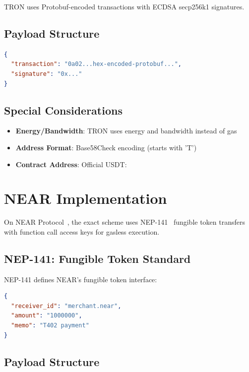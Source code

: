 TRON uses Protobuf-encoded transactions with ECDSA secp256k1 signatures.

\subsection{Payload Structure}

\begin{lstlisting}[language=json,caption={TRON exact scheme payload}]
{
  "transaction": "0a02...hex-encoded-protobuf...",
  "signature": "0x..."
}
\end{lstlisting}

\subsection{Special Considerations}

\begin{itemize}
    \item \textbf{Energy/Bandwidth}: TRON uses energy and bandwidth instead of gas
    \item \textbf{Address Format}: Base58Check encoding (starts with 'T')
    \item \textbf{Contract Address}: Official USDT: 
\end{itemize}

\section{NEAR Implementation}
\label{sec:near-implementation}

On NEAR Protocol~\cite{near}, the exact scheme uses NEP-141~\cite{nep141} fungible token transfers with function call access keys for gasless execution.

\subsection{NEP-141: Fungible Token Standard}

NEP-141 defines NEAR's fungible token interface:

\begin{lstlisting}[language=json,caption={NEP-141 transfer call}]
{
  "receiver_id": "merchant.near",
  "amount": "1000000",
  "memo": "T402 payment"
}
\end{lstlisting}

\subsection{Payload Structure}

